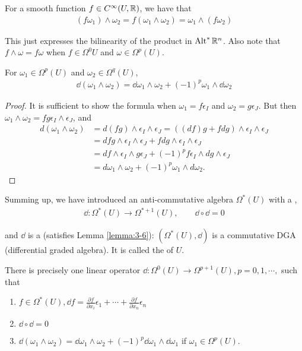 For a smooth function $f\in C^\infty(U, \mathbb{R})$, we have that
\begin{align*}
  (f\omega_1)\wedge\omega_2 = f(\omega_1\wedge\omega_2) = \omega_1\wedge(f\omega_2)
\end{align*}

This just expresses the bilinearity of the product in $\operatorname{Alt}^{*}\mathbb{R}^n$. Also note that 
$f\wedge\omega = f\omega$ when $f\in\Omega^0{U}$ and $\omega\in\Omega^p(U)$.

\begin{lemma}\label{lemma:3-6}
For $\omega_1\in\Omega^p(U)$ and $\omega_2\in\Omega^q(U)$,
\begin{align*}
  \dd(\omega_1\wedge\omega_2) = \dd\omega_1\wedge\omega_2 + (-1)^p\omega_1\wedge\dd\omega_2
\end{align*}
\end{lemma}

\begin{proof}
  It is sufficient to show the formula when $\omega_1=f\epsilon_I$ and $\omega_2=g\epsilon_J$. But 
  then $\omega_1\wedge\omega_2 = fg\epsilon_I\wedge\epsilon_J$, and 
  \begin{align*}
    d(\omega_1\wedge\omega_2) 
    & = d(fg)\wedge\epsilon_{I}\wedge\epsilon_{J}=((df)g+fdg)\wedge\epsilon_{I}\wedge\epsilon_{J} \\
    & = dfg\wedge\epsilon_{I}\wedge\epsilon_{J}+fdg\wedge\epsilon_{I}\wedge\epsilon_{J} \\
    & = df\wedge\epsilon_{I}\wedge g\epsilon_{J}+(-1)^{p}f\epsilon_{I}\wedge dg\wedge\epsilon_{J} \\
    & = d\omega_{1}\wedge\omega_{2}+(-1)^{p}\omega_{1}\wedge d\omega_{2}. 
  \end{align*}
\end{proof}

Summing up, we have introduced an anti-commutative algebra $\Omega^*(U)$ with a ,
\begin{align*}
  \dd:\Omega^*(U)\to\Omega^{*+1}(U), \qquad \dd\circ\dd = 0
\end{align*}

and $\dd$ is a  (satisfies Lemma \ref{lemma:3-6}): $(\Omega^*(U), \dd)$ is a commutative DGA
(differential graded algebra). It is called the  of $U$.

\begin{theorem}\label{theorem:3-7}
There is precisely one linear operator $\dd:\Omega^0(U)\to\Omega^{p+1}(U), p = 0,1, \cdots,$ such that  
\begin{enumerate}[label=(\roman*)]
  \item $f\in\Omega^*(U), \dd f = \frac{\partial f }{\partial x_i }\epsilon_1 + \cdots + \frac{\partial f}{\partial x_n}\epsilon_n$
  \item $\dd\circ\dd = 0$
  \item $\dd(\omega_1\wedge\omega_2) = \dd\omega_1\wedge\omega_2 + (-1)^p\dd\omega_1\wedge\dd\omega_1$ if $\omega_1\in\Omega^p(U)$.
\end{enumerate}
\end{theorem}

